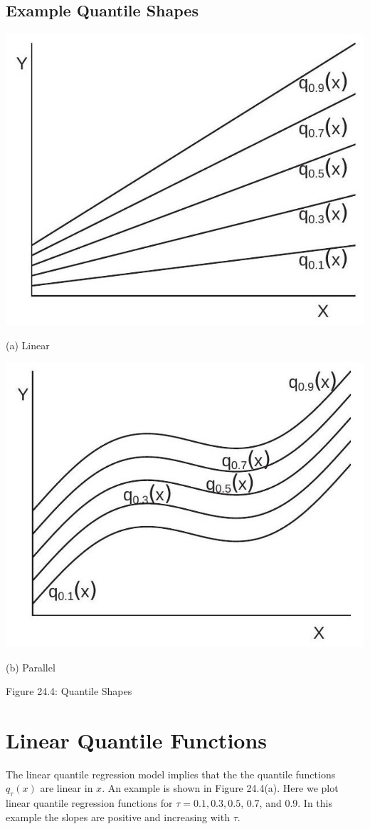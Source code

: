 \documentclass[10pt]{article}
\begin{document}
\subsection{Example Quantile Shapes}
\includegraphics[max width=\textwidth]{2022_10_23_47027c652ef567187a65g-08}

(a) Linear

\includegraphics[max width=\textwidth]{2022_10_23_47027c652ef567187a65g-08(1)}

(b) Parallel

Figure 24.4: Quantile Shapes

\section{Linear Quantile Functions}
The linear quantile regression model implies that the the quantile functions $q_{\tau}(x)$ are linear in $x$. An example is shown in Figure 24.4(a). Here we plot linear quantile regression functions for $\tau=0.1,0.3,0.5$, 0.7, and 0.9. In this example the slopes are positive and increasing with $\tau$.
\end{document}
